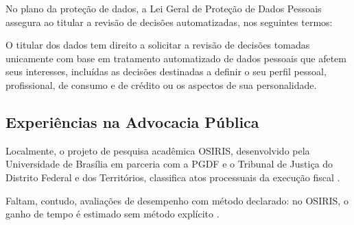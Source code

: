 No plano da proteção de dados, a Lei Geral de Proteção de Dados Pessoais
assegura ao titular a revisão de decisões automatizadas, nos seguintes termos:

\begin{citacao}
O titular dos dados tem direito a solicitar a revisão de decisões tomadas
unicamente com base em tratamento automatizado de dados pessoais que afetem
seus interesses, incluídas as decisões destinadas a definir o seu perfil
pessoal, profissional, de consumo e de crédito ou os aspectos de sua
personalidade. \parencite[art.~20]{brasil2018lgpd}
\end{citacao}

\subsection{Experiências na Advocacia Pública}

Localmente, o projeto de pesquisa acadêmica OSIRIS, desenvolvido pela
Universidade de Brasília em parceria com a PGDF e o Tribunal de Justiça do
Distrito Federal e dos Territórios, classifica atos processuais da execução
fiscal \parencite{braz2025,bonat2026}.

Faltam, contudo, avaliações de desempenho com método declarado: no OSIRIS, o
ganho de tempo é estimado sem método explícito \parencite{bonat2026}.

